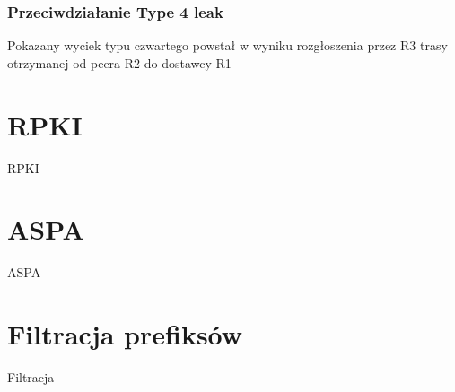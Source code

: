 \subsubsection{Przeciwdziałanie Type 4 leak}
\label{sec:bgp-roles-analysis-type4leak}

Pokazany wyciek typu czwartego powstał w wyniku rozgłoszenia przez R3 trasy otrzymanej od peera R2 do dostawcy R1

\section{RPKI}
\label{sec:rpki}

RPKI

\section{ASPA}
\label{sec:aspa}

ASPA

\section{Filtracja prefiksów}
\label{sec:filtracja-prefiksow}

Filtracja

